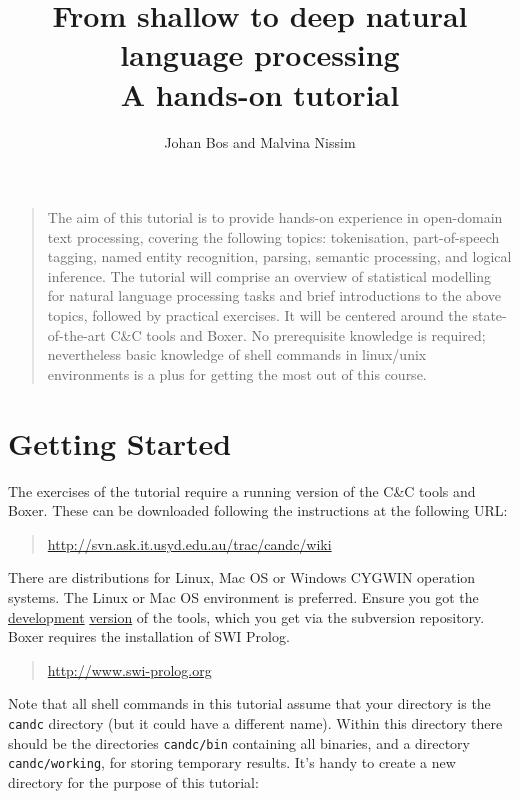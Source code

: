 \documentclass[11pt]{article}
\title{From shallow to deep natural language processing\\
       A hands-on tutorial}
\author{Johan Bos and Malvina Nissim}
\begin{document}
\maketitle

\begin{quote}
The aim of this tutorial is to provide hands-on experience in
open-domain text processing, covering the following topics:
tokenisation, part-of-speech tagging, named entity recognition,
parsing, semantic processing, and logical inference.  The tutorial
will comprise an overview of statistical modelling for natural
language processing tasks and brief introductions to the above topics,
followed by practical exercises.  It will be centered around the
state-of-the-art C\&C tools and Boxer.  No prerequisite knowledge is
required; nevertheless basic knowledge of shell commands in linux/unix
environments is a plus for getting the most out of this course.
\end{quote}

\tableofcontents

\clearpage
\section*{Getting Started}

The exercises of the tutorial require a running version of the C\&C
tools and Boxer.  These can be downloaded following the instructions at
the following URL:

\begin{quote}	
\url{http://svn.ask.it.usyd.edu.au/trac/candc/wiki}
\end{quote}

There are distributions for Linux, Mac OS or Windows CYGWIN operation
systems. The Linux or Mac OS environment is preferred. Ensure you got
the \underline{develo}p\underline{ment} \underline{version} of the
tools, which you get via the subversion repository.
Boxer requires the installation of SWI Prolog. 

\begin{quote}	
\url{http://www.swi-prolog.org}
\end{quote}

Note that all shell commands in this tutorial assume that your
directory is the \texttt{candc} directory (but it could have a
different name). Within this directory there should be the directories
\texttt{candc/bin} containing all binaries, and a directory
\texttt{candc/working}, for storing temporary results. It's handy to
create a new directory for the purpose of this tutorial:
\end{document}
